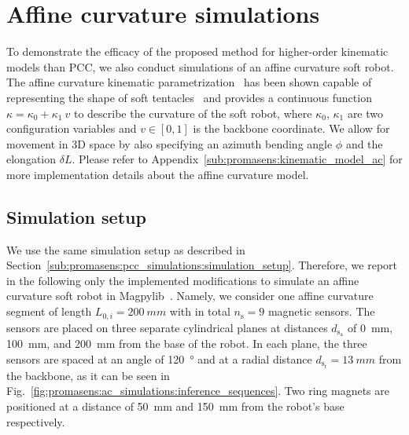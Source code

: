 \section{Affine curvature simulations}\label{sec:promasens:ac_simulations}
To demonstrate the efficacy of the proposed method for higher-order kinematic models than PCC, we also conduct simulations of an affine curvature soft robot.
The affine curvature kinematic parametrization~\cite{della2020soft} has been shown capable of representing the shape of soft tentacles~\cite{stella2022experimental, stella2022piecewise_preprint} and provides a continuous function $\kappa = \kappa_0 + \kappa_1 \: v$ to describe the curvature of the soft robot, where $\kappa_0$, $\kappa_1$ are two configuration variables and $v \in [0, 1]$ is the backbone coordinate. We allow for movement in 3D space by also specifying an azimuth bending angle $\phi$ and the elongation $\delta L$.
Please refer to Appendix~\ref{sub:promasens:kinematic_model_ac} for more implementation details about the affine curvature model.


\subsection{Simulation setup}\label{sub:promasens:ac_simulations:simulation_setup}
We use the same simulation setup as described in Section~\ref{sub:promasens:pcc_simulations:simulation_setup}. 
Therefore, we report in the following only the implemented modifications to simulate an affine curvature soft robot in Magpylib~\cite{magpylib2020}.
Namely, we consider one affine curvature segment of length $L_{0,i} = \SI{200}{mm}$ with in total $n_\mathrm{s} = 9$ magnetic sensors. 
The sensors are placed on three separate cylindrical planes at distances $d_{\mathrm{s}_\mathrm{a}}$ of \SI{0}{mm}, \SI{100}{mm}, and \SI{200}{mm} from the base of the robot. In each plane, the three sensors are spaced at an angle of \SI{120}{\degree} and at a radial distance $d_{\mathrm{s}_\mathrm{r}} = \SI{13}{mm}$ from the backbone, as it can be seen in Fig.~\ref{fig:promasens:ac_simulations:inference_sequences}.
Two ring magnets are positioned at a distance of \SI{50}{mm} and \SI{150}{mm} from the robot's base respectively.

